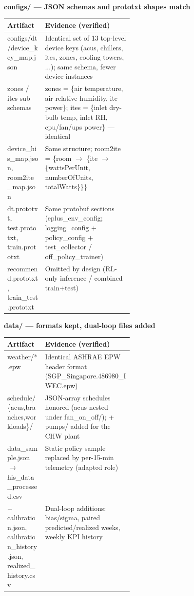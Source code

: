 \documentclass[10pt]{article}
\begin{document}
\smallskip\noindent\textbf{configs/\allowbreak{} — JSON schemas and prototxt shapes match}\\[1pt]
\vspace{1pt}\begin{tabularx}{\linewidth}{@{}p{0.30\linewidth} X@{}}
\toprule
\textbf{Artifact} & \textbf{Evidence (verified)} \\
\midrule
configs/\allowbreak{}dt/\allowbreak{}device\_\allowbreak{}key\_\allowbreak{}map.json & Identical set of 13 top-level device keys (acus, chillers, ites, zones, cooling towers, ...); same schema, fewer device instances \\
zones /\allowbreak{} ites sub-schemas & zones = \{air temperature, air relative humidity, ite power\}; ites = \{inlet dry-bulb temp, inlet RH, cpu/\allowbreak{}fan/\allowbreak{}ups power\} — identical \\
device\_\allowbreak{}his\_\allowbreak{}map.json, room2ite\_\allowbreak{}map.json & Same structure; room2ite = \{room $\rightarrow$ \{ite $\rightarrow$ \{wattsPerUnit, numberOfUnits, totalWatts\}\}\} \\
dt.prototxt, test.prototxt, train.prototxt & Same protobuf sections (eplus\_\allowbreak{}env\_\allowbreak{}config; logging\_\allowbreak{}config + policy\_\allowbreak{}config + test\_\allowbreak{}collector /\allowbreak{} off\_\allowbreak{}policy\_\allowbreak{}trainer) \\
recommend.prototxt, train\_\allowbreak{}test.prototxt & Omitted by design (RL-only inference /\allowbreak{} combined train+test) \\
\bottomrule
\end{tabularx}\vspace{2pt}
\smallskip\noindent\textbf{data/\allowbreak{} — formats kept, dual-loop files added}\\[1pt]
\vspace{1pt}\begin{tabularx}{\linewidth}{@{}p{0.30\linewidth} X@{}}
\toprule
\textbf{Artifact} & \textbf{Evidence (verified)} \\
\midrule
weather/\allowbreak{}*.epw & Identical ASHRAE EPW header format (SGP\_\allowbreak{}Singapore.486980\_\allowbreak{}IWEC.epw) \\
schedule/\allowbreak{}\{acus,branches,workloads\}/\allowbreak{} & JSON-array schedules honored (acus nested under fan\_\allowbreak{}on\_\allowbreak{}off/\allowbreak{}); + pumps/\allowbreak{} added for the CHW plant \\
data\_\allowbreak{}sample.json $\rightarrow$ his\_\allowbreak{}data\_\allowbreak{}processed.csv & Static policy sample replaced by per-15-min telemetry (adapted role) \\
+ calibration.json, calibration\_\allowbreak{}history.json, realized\_\allowbreak{}history.csv & Dual-loop additions: bias/\allowbreak{}sigma, paired predicted/\allowbreak{}realized weeks, weekly KPI history \\
\bottomrule
\end{tabularx}\vspace{2pt}
\end{document}
